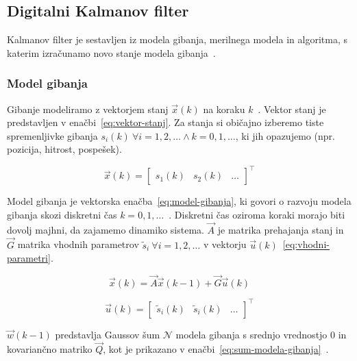 \subsection{Digitalni Kalmanov filter}\label{sec:kalmanov-filter}
Kalmanov filter je sestavljen iz modela gibanja, merilnega modela in algoritma, s katerim izračunamo novo stanje modela gibanja~\cite{trucco1998introductory}.

\subsubsection{Model gibanja}
Gibanje modeliramo z vektorjem stanj $\vec{x}(k)$ na koraku $k$~\cite{trucco1998introductory}. Vektor stanj je predstavljen v enačbi~\eqref{eq:vektor-stanj}. Za stanja si običajno izberemo tiste spremenljivke gibanja $s_i(k)~\forall i = 1,2,\ldots \land k = 0, 1,\ldots$, ki jih opazujemo (npr. pozicija, hitrost, pospešek).

\begin{equation}
\vec{x}(k) = \begin{bmatrix}
					s_1(k) & s_2(k) & \ldots
\end{bmatrix}^\top
\label{eq:vektor-stanj} 
\end{equation}


Model gibanja je vektorska enačba~\eqref{eq:model-gibanja}, ki govori o razvoju modela gibanja skozi diskretni čas $k = 0,1,\ldots$~\cite{trucco1998introductory}. Diskretni čas oziroma koraki morajo biti dovolj majhni, da zajamemo dinamiko sistema. $\vec{A}$ je matrika prehajanja stanj in $\vec{G}$ matrika vhodnih parametrov $\tilde{s}_i~\forall i = 1,2,\ldots$ v vektorju $\vec{u}(k)$~\eqref{eq:vhodni-parametri}. 



\begin{equation}
\vec{x}(k) = \vec{A} \vec{x}(k-1) + \vec{G} \vec{u}(k)
\label{eq:model-gibanja}
\end{equation}

\begin{equation}
\vec{u}(k) = \begin{bmatrix}
					\tilde{s}_i(k) & \tilde{s}_i(k) & \ldots
			\end{bmatrix}^\top 
\label{eq:vhodni-parametri}
\end{equation}

$\vec{w}(k-1)$ predstavlja Gaussov šum $\mathcal{N}$ modela gibanja s srednjo vrednostjo $0$ in kovariančno matriko $\vec{Q}$, kot je prikazano v enačbi~\eqref{eq:sum-modela-gibanja}~\cite{trucco1998introductory}.


